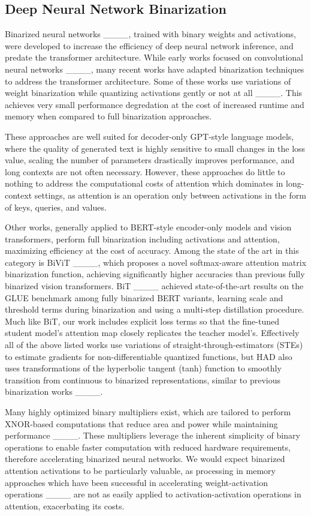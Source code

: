 \subsection{Deep Neural Network Binarization}
Binarized neural networks ____, trained with binary weights and activations, were developed to increase the efficiency of deep neural network inference, and predate the transformer architecture.  While early works focused on convolutional neural networks ____, many recent works have adapted binarization techniques to address the transformer architecture.  Some of these works use variations of weight binarization while quantizing activations gently or not at all ____.  This achieves very small performance degredation at the cost of increased runtime and memory when compared to full binarization approaches. 
\par These approaches are well suited for decoder-only GPT-style language models, where the quality of generated text is highly sensitive to small changes in the loss value, scaling the number of parameters drastically improves performance, and long contexts are not often necessary.  However, these approaches do little to nothing to address the computational costs of attention which dominates in long-context settings, as attention is an operation only between activations in the form of keys, queries, and values.  
\par Other works, generally applied to BERT-style encoder-only models and vision transformers, perform full binarization including activations and attention, maximizing efficiency at the cost of accuracy.  Among the state of the art in this category is BiViT ____, which proposes a novel softmax-aware attention matrix binarization function, achieving significantly higher accuracies than previous fully binarized vision transformers.  BiT ____ achieved state-of-the-art results on the GLUE benchmark among fully binarized BERT variants, learning scale and threshold terms during binarization and using a multi-step distillation procedure.  Much like BiT, our work includes explicit loss terms so that the fine-tuned student model's attention map closely replicates the teacher model's.  Effectively all of the above listed works use variations of straight-through-estimators (STEs) to estimate gradients for non-differentiable quantized functions, but HAD also uses transformations of the hyperbolic tangent (tanh) function to smoothly transition from continuous to binarized representations, similar to previous binarization works ____. 
\par Many highly optimized binary multipliers exist, which are tailored to perform XNOR-based computations that reduce area and power while maintaining performance ____. These multipliers leverage the inherent simplicity of binary operations to enable faster computation with reduced hardware requirements, therefore accelerating binarized neural networks. We would expect binarized attention activations to be particularly valuable, as processing in memory approaches which have been successful in accelerating weight-activation operations ____ are not as easily applied to activation-activation operations in attention, exacerbating its costs.

